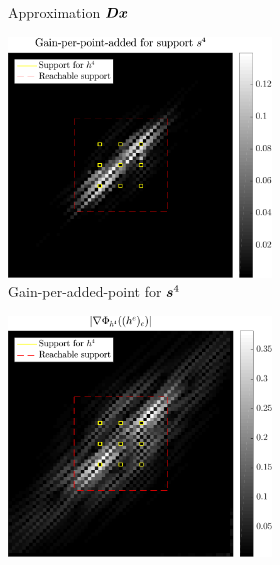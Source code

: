 \begin{figure}[!h]
\begin{subfigure}[b]{0.8\textwidth}
\begin{subfigure}[b]{0.49\linewidth}
\caption{Approximation $\bm{D}\bm{x}$} \label{fig_gain_n4_approx}
\end{subfigure}
\begin{subfigure}[b]{0.49\linewidth}\centering
\includegraphics[width=\linewidth]{figures/xp/n4/xp_128x128_sc2_angl1_K3_S3_node4_objmatrix.pdf}
\caption{Gain-per-added-point for $\bm{s}^4$}
\end{subfigure}
\begin{subfigure}[b]{0.49\linewidth}\centering
\includegraphics[width=\linewidth]{figures/xp/n4/xp_128x128_sc2_angl1_K3_S3_node4_partgrad4.pdf}

\end{subfigure}
\end{subfigure}
\end{figure}
